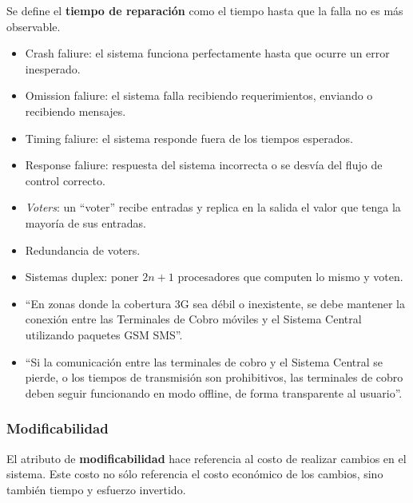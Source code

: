 \documentclass[]{article}
\begin{document}
Se define el \textbf{tiempo de reparación} como el tiempo hasta que la falla no es más observable.

\begin{itemize}
    \item Crash faliure: el sistema funciona perfectamente hasta que ocurre un error inesperado.
    \item Omission faliure: el sistema falla recibiendo requerimientos, enviando o recibiendo mensajes.
    \item Timing faliure: el sistema responde fuera de los tiempos esperados.
    \item Response faliure: respuesta del sistema incorrecta o se desvía del flujo de control correcto.
\end{itemize}

\begin{itemize}
    \item \emph{Voters}: un ``voter'' recibe entradas y replica en la salida el valor que tenga la mayoría de sus entradas.
    \item Redundancia de voters.
    \item Sistemas duplex: poner $2n+1$ procesadores que computen lo mismo y voten.
\end{itemize}






















\begin{itemize}
	\item ``En zonas donde la cobertura 3G sea débil o inexistente, se debe mantener la conexión entre las Terminales de Cobro móviles y el Sistema Central utilizando paquetes GSM SMS''.
	\item ``Si la comunicación entre las terminales de cobro y el Sistema Central se pierde, o los tiempos de transmisión son prohibitivos, las terminales de cobro deben seguir funcionando en modo offline, de forma transparente al usuario''.
\end{itemize}

\subsubsection{Modificabilidad}
El atributo de \textbf{modificabilidad} hace referencia al costo de realizar cambios en el sistema. Este costo no sólo referencia el costo económico de los cambios, sino también tiempo y esfuerzo invertido.
\end{document}
